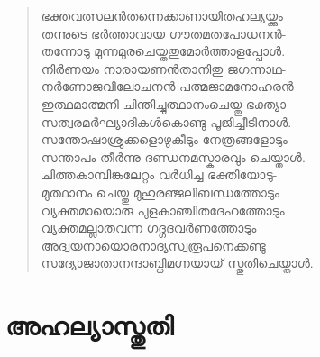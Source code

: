 \begin{verse}
ഭക്തവത്സലന്‍തന്നെക്കാണായിതഹല്യയ്ക്കും\\
തന്നുടെ ഭര്‍ത്താവായ ഗൗതമതപോധനന്‍-\\
തന്നോടു മുന്നമുരചെയ്തതുമോര്‍ത്താളപ്പോള്‍.\\
നിര്‍ണയം നാരായണന്‍താനിതു ജഗന്നാഥ-\\
നര്‍ണോജവിലോചനന്‍ പത്മജാമനോഹരന്‍\\
ഇത്ഥമാത്മനി ചിന്തിച്ചുത്ഥാനംചെയ്തു ഭക്ത്യാ\\
സത്വരമര്‍ഘ്യാദികള്‍കൊണ്ടു പൂജിച്ചീടിനാള്‍.\\
സന്തോഷാശ്രുക്കളൊഴുകീടും നേത്രങ്ങളോടും\\
സന്താപം തീര്‍ന്നു ദണ്ഡനമസ്കാരവും ചെയ്താള്‍.\\
ചിത്തകാമ്പിങ്കലേറ്റം വര്‍ധിച്ച ഭക്തിയോടു-\\
മുത്ഥാനം ചെയ്തു മുഹുരഞ്ജലിബന്ധത്തോടും\\
വ്യക്തമായൊരു പുളകാഞ്ചിതദേഹത്തോടും\\
വ്യക്തമല്ലാതവന്ന ഗദ്ഗദവര്‍ണത്തോടും\\
അദ്വയനായൊരനാദ്യസ്വരൂപനെക്കണ്ടു\\
സദ്യോജാതാനന്ദാബ്ധിമഗ്നയായ് സ്തുതിചെയ്താള്‍.
\end{verse}


\section{അഹല്യാസ്തുതി}

